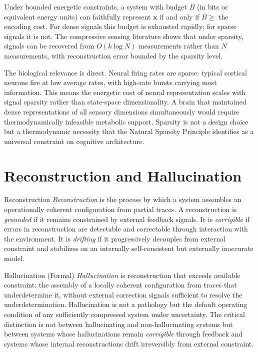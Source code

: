 Under bounded energetic constraints, a system with budget $B$ (in bits or equivalent
energy units) can faithfully represent $\mathbf{x}$ if and only if $B \geq$ the
encoding cost. For dense signals this budget is exhausted rapidly; for sparse signals
it is not. The compressive sensing literature shows that under sparsity, signals can
be recovered from $O(k \log N)$ measurements rather than $N$ measurements, with
reconstruction error bounded by the sparsity level.

The biological relevance is direct. Neural firing rates are sparse: typical cortical
neurons fire at low average rates, with high-rate bursts carrying most information.
This means the energetic cost of neural representation scales with signal sparsity
rather than state-space dimensionality. A brain that maintained dense representations
of all sensory dimensions simultaneously would require thermodynamically infeasible
metabolic support. Sparsity is not a design choice but a thermodynamic necessity
that the Natural Sparsity Principle identifies as a universal constraint on
cognitive architecture.

\section{Reconstruction and Hallucination}

\begin{definition}{Reconstruction}
\emph{Reconstruction} is the process by which a system assembles an operationally
coherent configuration from partial traces. A reconstruction is \emph{grounded} if
it remains constrained by external feedback signals. It is \emph{corrigible} if
errors in reconstruction are detectable and correctable through interaction with the
environment. It is \emph{drifting} if it progressively decouples from external
constraint and stabilizes on an internally self-consistent but externally inaccurate
model.
\end{definition}

\begin{definition}{Hallucination (Formal)}
\emph{Hallucination} is reconstruction that exceeds available constraint: the
assembly of a locally coherent configuration from traces that underdetermine it,
without external correction signals sufficient to resolve the underdetermination.
Hallucination is not a pathology but the default operating condition of any
sufficiently compressed system under uncertainty. The critical distinction is not
between hallucinating and non-hallucinating systems but between systems whose
hallucinations remain \emph{corrigible} through feedback and systems whose internal
reconstructions drift irreversibly from external constraint.
\end{definition}


